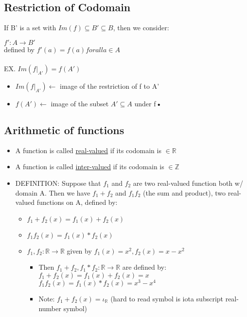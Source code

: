 \documentclass{article}
\begin{document}
\subsection{Restriction of Codomain}
If B' is a set with $Im(f) \subseteq B' \subseteq B$, then we consider:

\indent $f':A \rightarrow B'$\\
\indent defined by  $f'(a) = f(a) for all a \in A$\\ \\
\indent EX. $Im(f|_{A'}) = f(A')$\\
\begin{itemize}
\item $Im(f|_{A'}) \leftarrow$ image of the restriction of f to A'
\item $f(A') \leftarrow$ image of the subset $A' \subseteq A$ under f\textbf{•} 
\end{itemize}

\subsection{Arithmetic of functions}
\begin{itemize}
\item A function is called \underline{real-valued} if its codomain is $\in \mathbb{R}$
\item A function is called \underline{inter-valued} if its codomain is $\in \mathbb{Z}$
\item DEFINITION: Suppose that $f_{1}$ and $f_{2}$ are two real-valued function both w/ domain A. Then we have $f_{1} + f_{2}$ and $f_{1}f_{2}$ (the sum and product), two real-valued functions on A, defined by:
\begin{itemize}
\item $f_{1} + f_{2}(x) = f_{1}(x) + f_{2}(x)$
\item $f_{1}f_{2}(x) = f_{1}(x) * f_{2}(x)$
\item $f_{1},f_{2}:\mathbb{R} \rightarrow \mathbb{R}$ given by $f_{1}(x)=x^2, f_{2}(x)=x-x^2$
\begin{itemize}
\item Then $f_{1}+f_{2}, f_{1}*f_{2}:\mathbb{R} \rightarrow \mathbb{R}$ are defined by:\\
			$f_{1} + f_{2}(x) = f_{1}(x) + f_{2}(x)=x $\\
			$f_{1}f_{2}(x) = f_{1}(x) * f_{2}(x)=x^3-x^4$
\item Note: $f_{1} + f_{2}(x) = \iota_{\mathbb{R}}$ (hard to read symbol is iota subscript real-number symbol)
\end{itemize}
\end{itemize}
\end{itemize}
\end{document}
